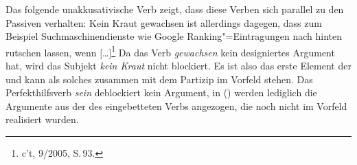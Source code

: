 \noindent
Das folgende unakkusativische Verb zeigt, dass diese Verben sich parallel zu den Passiven verhalten:
\ea
Kein Kraut gewachsen ist allerdings dagegen, dass zum Beispiel Suchmaschinendienste wie Google Ranking"=Eintragungen
nach hinten rutschen lassen, wenn [\ldots]\footnote{
c't, 9/2005, S.\,93.
}
\z
Da das Verb \emph{gewachsen} kein designiertes Argument hat, wird das Subjekt \emph{kein Kraut} nicht blockiert.
Es ist also das erste Element der \compsl und kann als solches zusammen mit dem Partizip im Vorfeld stehen.
Das Perfekthilfsverb \emph{sein} deblockiert kein Argument, in () werden lediglich die Argumente aus der \compsl
des eingebetteten Verbs angezogen, die noch nicht im Vorfeld realisiert wurden.






